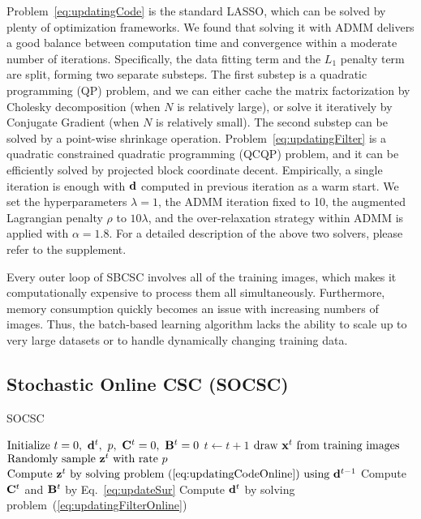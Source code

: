 Problem~\eqref{eq:updatingCode} is the standard LASSO, which can be
solved by plenty of optimization frameworks. We found that solving it
with ADMM delivers a good balance between computation time and
convergence within a moderate number of iterations. Specifically, the
data fitting term and the $L_1$ penalty term are split, forming two
separate substeps. The first substep is a quadratic programming (QP)
problem, and we can either cache the matrix factorization by Cholesky
decomposition (when $N$ is relatively large), or solve it iteratively
by Conjugate Gradient (when $N$ is relatively small). The second
substep can be solved by a point-wise shrinkage operation.
Problem~\eqref{eq:updatingFilter} is a quadratic constrained
quadratic programming (QCQP) problem, and it can be efficiently solved
by projected block coordinate decent. Empirically, a single iteration
is enough with $\filter$ computed in previous iteration as a warm
start. We set the hyperparameters $\lambda=1$, the ADMM iteration
fixed to 10, the augmented Lagrangian penalty $\rho$ to $10 \lambda$,
and the over-relaxation strategy within ADMM is applied with $\alpha =
1.8$. For a detailed description of the above two solvers, please
refer to the supplement.

Every outer loop of SBCSC involves all of the training images, which
makes it computationally expensive to process them all simultaneously.
Furthermore, memory consumption quickly becomes an issue with
increasing numbers of images. Thus, the batch-based learning algorithm
lacks the ability to scale up to very large datasets or to handle
dynamically changing training data.


\subsection{Stochastic Online CSC (SOCSC)}

\begin{algorithm}[H]
\caption{SOCSC} \label{algo:SOCSC}
\begin{algorithmic}[1]
\State $\text{Initialize} ~ t=0, ~\filter^t, ~p, ~\surC^t = 0, ~\surB^t = 0$
    \State $t \gets t+1$
    \State $ \text{draw } \signal^t \text{ from training images} $
    \State $ \text{Randomly sample }\code^t \text{ with rate } p $
    \State $ \text{Compute } \code^t \text{ by solving problem~(\ref{eq:updatingCodeOnline}) using } \filter^{t-1}$
    \State Compute $\surC^t$ and $\surB^t$ by Eq.~\ref{eq:updateSur}
    \State Compute $\filter^t$ by solving problem~(\ref{eq:updatingFilterOnline})
\EndWhile
\end{algorithmic}
\end{algorithm}


